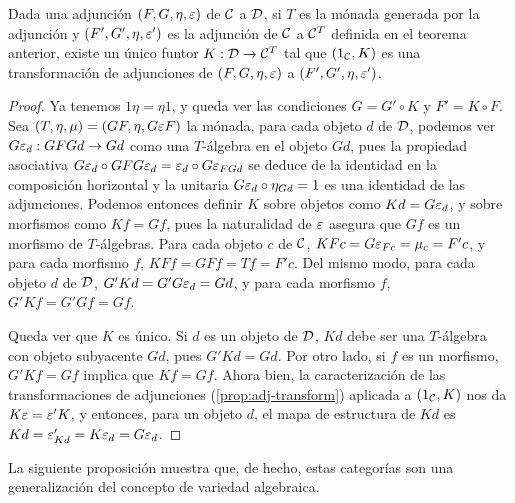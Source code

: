 \begin{theorem}
  Dada una adjunción $(F,G,\eta,\varepsilon)$ de $\mathcal{C}$ a $\mathcal{D}$, si $T$ es la mónada
  generada por la adjunción y $(F',G',\eta,\varepsilon')$ es la adjunción de $\mathcal{C}$ a
  $\mathcal{C}^T$ definida en el teorema anterior, existe un único funtor
  $K:\mathcal{D}\to\mathcal{C}^T$ tal que $(1_{\mathcal{C}},K)$ es una transformación de adjunciones de
  $(F,G,\eta,\varepsilon)$ a $(F',G',\eta,\varepsilon')$.
\end{theorem}
\begin{proof}
  Ya tenemos $1\eta=\eta1$, y queda ver las condiciones $G=G'\circ K$ y
  $F'=K\circ F$.  Sea $(T,\eta,\mu)=(GF,\eta,G\varepsilon F)$ la mónada, para cada
  objeto $d$ de $\mathcal{D}$, podemos ver $G\varepsilon_d:GFGd\to Gd$ como una $T$-álgebra en
  el objeto $Gd$, pues la propiedad asociativa
  $G\varepsilon_d\circ GFG\varepsilon_d=\varepsilon_d\circ G\varepsilon_{FGd}$ se deduce de la identidad en
  la composición horizontal y la unitaria $G\varepsilon_d\circ\eta_{Gd}=1$ es una
  identidad de las adjunciones. Podemos entonces definir $K$ sobre objetos como
  $Kd=G\varepsilon_d$, y sobre morfismos como $Kf=Gf$, pues la naturalidad de $\varepsilon$
  asegura que $Gf$ es un morfismo de $T$-álgebras. Para cada objeto $c$ de
  $\mathcal{C}$, $KFc=G\varepsilon_{Fc}=\mu_c=F'c$, y para cada morfismo $f$,
  $KFf=GFf=Tf=F'c$. Del mismo modo, para cada objeto $d$ de $\mathcal{D}$,
  $G'Kd=G'G\varepsilon_d=Gd$, y para cada morfismo $f$, $G'Kf=G'Gf=Gf$.

  Queda ver que $K$ es único. Si $d$ es un objeto de $\mathcal{D}$, $Kd$ debe ser una
  $T$-álgebra con objeto subyacente $Gd$, pues $G'Kd=Gd$. Por otro lado, si $f$
  es un morfismo, $G'Kf=Gf$ implica que $Kf=Gf$. Ahora bien, la caracterización
  de las transformaciones de adjunciones (\ref{prop:adj-transform}) aplicada a
  $(1_{\mathcal{C}},K)$ nos da $K\varepsilon=\varepsilon'K$, y entonces, para un objeto $d$, el mapa de
  estructura de $Kd$ es $Kd=\varepsilon'_{Kd}=K\varepsilon_d=G\varepsilon_d$.
\end{proof}

La siguiente proposición muestra que, de hecho, estas categorías son una
generalización del concepto de variedad algebraica.

